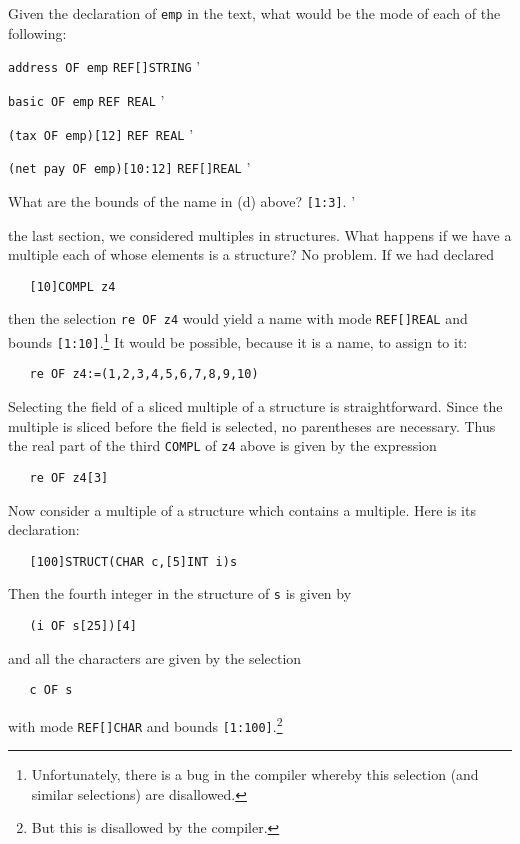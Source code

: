 \begin{exercise}
\item Given the declaration of \verb|emp| in the text, what would be
the mode of each of the following:
\begin{subex}
\item \verb|address OF emp| \subans \verb|REF[]STRING|
'
\item \verb|basic OF emp| \subans \verb|REF REAL|
'
\item \verb|(tax OF emp)[12]| \subans \verb|REF REAL|
'
\item \verb|(net pay OF emp)[10:12]| \subans \verb|REF[]REAL|
'
\end{subex}
\item What are the bounds of the name in (d) above?
\ans \verb|[1:3]|.
'
\end{exercise}

 the last section, we considered
multiples in structures.  What happens if we have a multiple each of
whose elements is a structure?  No problem.  If we had declared
\begin{verbatim}
   [10]COMPL z4
\end{verbatim}
\noindent
then the selection \verb|re OF z4| would yield a name with mode
\verb|REF[]REAL| and bounds \verb|[1:10]|.\footnote{Unfortunately,
there is a bug in the \protect{} compiler
whereby this selection (and similar selections) are disallowed.} It
would be possible, because it is a name, to assign to it:
\begin{verbatim}
   re OF z4:=(1,2,3,4,5,6,7,8,9,10)
\end{verbatim}

Selecting the field of a sliced multiple of a structure is
straightforward. Since the multiple is sliced before the field is
selected, no parentheses are necessary. Thus the real part of the
third \verb|COMPL| of \verb|z4| above is given by the expression
\begin{verbatim}
   re OF z4[3]
\end{verbatim}

Now consider a multiple of a structure which contains a multiple. Here
is its declaration:
\begin{verbatim}
   [100]STRUCT(CHAR c,[5]INT i)s
\end{verbatim}
\noindent
Then the fourth integer in the  structure of \verb|s| is
given by
\begin{verbatim}
   (i OF s[25])[4]
\end{verbatim}
\noindent
and all the characters are given by the selection
\begin{verbatim}
   c OF s
\end{verbatim}
\noindent
with mode \verb|REF[]CHAR| and bounds \verb|[1:100]|.\footnote{But
this is disallowed by the \protect{} compiler.}

